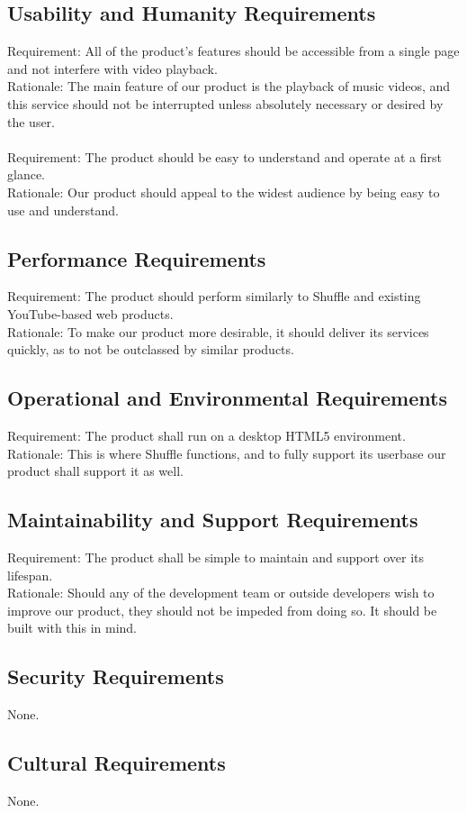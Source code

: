 \documentclass[12pt, titlepage]{article}
\begin{document}
\subsection{Usability and Humanity Requirements}
Requirement: All of the product's features should be accessible from a single page and not interfere with video playback.\\
Rationale: The main feature of our product is the playback of music videos, and this service should not be interrupted unless absolutely necessary or desired by the user.\\\\
Requirement: The product should be easy to understand and operate at a first glance.\\
Rationale: Our product should appeal to the widest audience by being easy to use and understand.
\subsection{Performance Requirements}
Requirement: The product should perform similarly to Shuffle and existing YouTube-based web products.\\
Rationale: To make our product more desirable, it should deliver its services quickly, as to not be outclassed by similar products.
\subsection{Operational and Environmental Requirements}
Requirement: The product shall run on a desktop HTML5 environment.\\
Rationale: This is where Shuffle functions, and to fully support its userbase our product shall support it as well.
\subsection{Maintainability and Support Requirements}
Requirement: The product shall be simple to maintain and support over its lifespan.\\
Rationale: Should any of the development team or outside developers wish to improve our product, they should not be impeded from doing so.  It should be built with this in mind.
\subsection{Security Requirements}
None.
\subsection{Cultural Requirements}
None.
\end{document}
